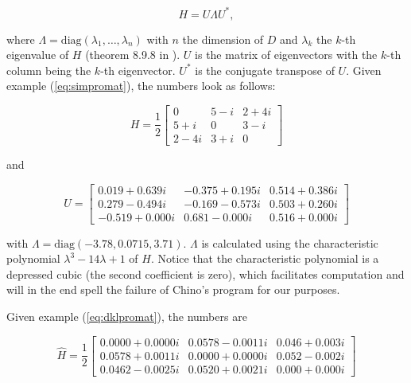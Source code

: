 \documentclass[11pt]{article}
\begin{document}
\begin{equation}
  \label{eq:unitary}
  H=U\Lambda{}U^{*},
\end{equation}

where $\Lambda=\mbox{diag}(\lambda_{1},\ldots,\lambda_{n})$ with $n$
the dimension of $D$ and $\lambda_{k}$ the $k$-th eigenvalue of $H$
(theorem 8.9.8 in ). $U$ is the matrix of
eigenvectors with the $k$-th column being the $k$-th eigenvector.
$U^{*}$ is the conjugate transpose of $U$. Given example
(\ref{eq:simpromat}), the numbers look as follows:

\begin{equation}
  \label{eq:simh}
H=\frac{1}{2}\left[
      \begin{array}{ccc}
        0 & 5-i & 2+4i \\
        5+i & 0 & 3-i \\
        2-4i & 3+i & 0 
      \end{array}
\right]
\end{equation}

and

\begin{equation}
  \label{eq:simu}
U=\left[
      \begin{array}{ccc}
   0.019 + 0.639i & -0.375 + 0.195i &  0.514 + 0.386i \\
   0.279 - 0.494i & -0.169 - 0.573i &  0.503 + 0.260i \\
  -0.519 + 0.000i &  0.681 - 0.000i &  0.516 + 0.000i
      \end{array}
\right]
\end{equation}

with $\Lambda=\mbox{diag}(-3.78,0.0715,3.71)$. $\Lambda$ is
calculated using the characteristic polynomial
$\lambda^{3}-14\lambda+1$ of $H$. Notice that the characteristic
polynomial is a depressed cubic (the second coefficient is zero),
which facilitates computation and will in the end spell the failure of
Chino's program for our purposes.

Given example (\ref{eq:dklpromat}), the numbers are
 
\begin{equation}
  \label{eq:dklh}
\hat{H}=\frac{1}{2}\left[
      \begin{array}{ccc}
   0.0000 + 0.0000i &  0.0578 - 0.0011i &  0.046 + 0.003i \\
   0.0578 + 0.0011i &  0.0000 + 0.0000i &  0.052 - 0.002i \\
   0.0462 - 0.0025i &  0.0520 + 0.0021i &  0.000 + 0.000i
      \end{array}
\right]
\end{equation}
\end{document}
